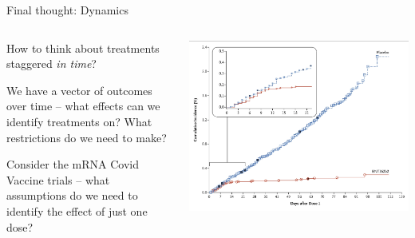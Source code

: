 \documentclass[notes,11pt, aspectratio=169]{beamer}
\newenvironment{wideitemize}{\itemize\addtolength{\itemsep}{10pt}}{\enditemize}
\begin{document}
\begin{frame}{Final thought: Dynamics}
\begin{columns}[T] %
  \begin{column}{.5\textwidth}
    \begin{wideitemize}
    \item How to think about treatments staggered \emph{in time}?
    \item We have a vector of outcomes over time -- what effects can we identify treatments on? What restrictions do we need to make?
    \item Consider the mRNA Covid Vaccine trials -- what assumptions do we need to identify the effect of just one dose?
    \end{wideitemize}
  \end{column}%
  \hfill%
  \begin{column}{.5\textwidth}
    \begin{center}
        \includegraphics[width=\linewidth]{images/vaccine_dynamics.png}
    \end{center}
  \end{column}
\end{columns}

\end{frame}
\end{document}

